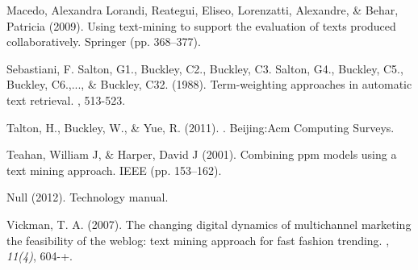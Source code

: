 \begin{thebibliography}{}
Macedo, Alexandra Lorandi, Reategui, Eliseo, Lorenzatti, Alexandre, \& Behar, Patricia (2009).
\newblock Using text-mining to support the evaluation of texts produced collaboratively. Springer (pp. 368--377).

Sebastiani, F. Salton, G1., Buckley, C2., Buckley, C3. Salton, G4., Buckley, C5., Buckley, C6.,..., \& Buckley, C32. (1988).
\newblock Term-weighting approaches in automatic text retrieval.
, 513-523.

Talton, H., Buckley, W., \& Yue, R. (2011).
. Beijing:Acm Computing Surveys.

Teahan, William J, \& Harper, David J (2001).
\newblock Combining ppm models using a text mining approach. IEEE (pp. 153--162).

Null (2012).
\newblock Technology manual.

Vickman, T. A. (2007).
\newblock The changing digital dynamics of multichannel marketing the feasibility of the weblog: text mining approach for fast fashion trending.
, {\em 11}{\em (4)}, 604-+.

\end{thebibliography}
    